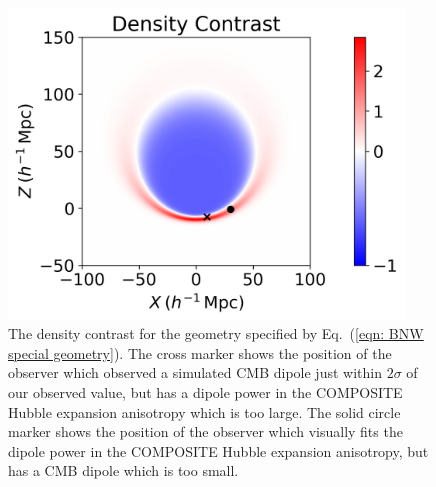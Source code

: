\documentclass[a4paper,12pt]{report}
\renewcommand{\eqref}[1]{Eq.~({#1})}
\begin{document}
\begin{figure}[t]
    \centering
    \includegraphics[width=105mm]{Figures/BNW Model MCMC/Special Geometry One/density contrast.png}
    \caption{The density contrast for the geometry specified by \eqref{\ref{eqn: BNW special geometry}}. The cross marker shows the position of the observer which observed a simulated CMB dipole just within $2\sigma$ of our observed value, but has a dipole power in the COMPOSITE Hubble expansion anisotropy which is too large. The solid circle marker shows the position of the observer which visually fits the dipole power in the COMPOSITE Hubble expansion anisotropy, but has a CMB dipole which is too small.}
    \label{fig: special geometry density contrast}
\end{figure}
\end{document}
